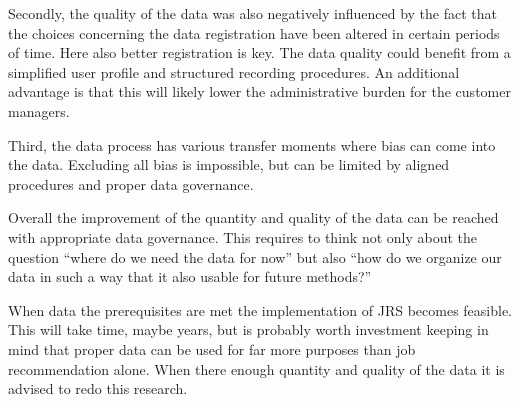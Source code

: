 Secondly, the quality of the data was also negatively influenced by the fact that the choices concerning the data registration have been altered in certain periods of time.
Here also better registration is key.
The data quality could benefit from a simplified user profile and structured recording procedures. An additional advantage is that this will likely lower the administrative burden for the customer managers.

Third, the data process has various transfer moments where bias can come into the data. 
Excluding all bias is impossible, but can be limited by aligned procedures and proper data governance.

Overall the improvement of the quantity and quality of the data can be reached with appropriate data governance. 
This requires to think not only about the question “where do we need the data for now” but also “how do we organize our data in such a way that it also usable for future methods?”

When data the prerequisites are met the implementation of JRS becomes feasible.
This will take time, maybe years, but is probably worth investment keeping in mind that proper data can be used for far more purposes than job recommendation alone.
When there enough quantity and quality of the data it is advised to redo this research. 

